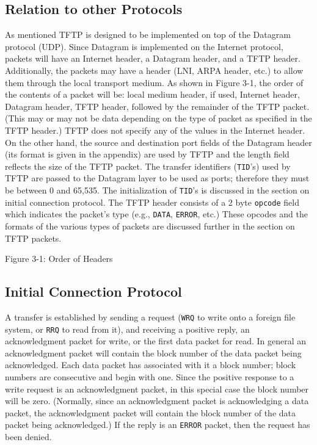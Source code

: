 \documentclass[12pt]{article}
\begin{document}
\subsection{Relation to other Protocols}
As mentioned TFTP is designed to be implemented on top of the Datagram protocol (UDP). Since Datagram is implemented on the Internet protocol, packets will have an Internet header, a Datagram header, and a TFTP header.  Additionally, the packets may have a header (LNI, ARPA header, etc.)  to allow them through the local transport medium. As shown in Figure 3-1, the order of the contents of a packet will be: local medium header, if used, Internet header, Datagram header, TFTP header, followed by the remainder of the TFTP packet. (This may or may not be data depending on the type of packet as specified in the TFTP header.)  TFTP does not specify any of the values in the Internet header. On the other hand, the source and destination port fields of the Datagram header (its format is given in the appendix) are used by TFTP and the length field reflects the size of the TFTP packet. The transfer identifiers (\verb|TID|'s) used by
TFTP are passed to the Datagram layer to be used as ports; therefore they must be between 0 and 65,535. The initialization of \verb|TID|'s is discussed in the section on initial connection protocol. The  TFTP header consists of a 2 byte \verb|opcode| field which indicates the packet's type (e.g., \verb|DATA|, \verb|ERROR|, etc.)  These opcodes and  the formats of  the various types of packets are discussed further in the section on TFTP packets.\\

\begin{center}
Figure 3-1: Order of Headers
\end{center}

\subsection{Initial Connection Protocol}
A transfer is established by sending a request (\verb|WRQ| to write onto a foreign file system, or \verb|RRQ| to read from it), and receiving a positive reply, an acknowledgment packet for write, or the first data packet for read. In general an acknowledgment packet will contain the block number of the data packet being acknowledged. Each data packet has associated with it a block number; block numbers are consecutive and begin with one. Since the positive response to a write request is an acknowledgment packet, in this special case the block number will be zero. (Normally, since an acknowledgment packet is acknowledging a data packet, the acknowledgment packet will contain the block number of the data packet being acknowledged.) If the reply is an   \verb|ERROR| packet, then the request has been denied.\\
\end{document}

